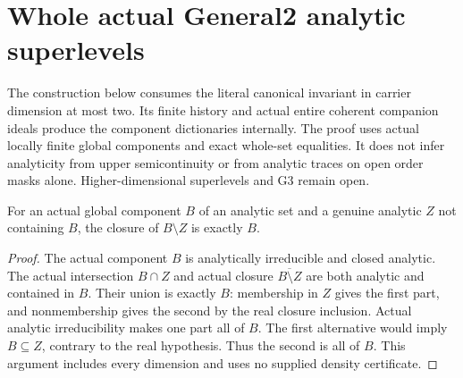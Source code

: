 \section{Whole actual General2 analytic superlevels}

The construction below consumes the literal canonical invariant in carrier
dimension at most two. Its finite history and actual entire coherent companion
ideals produce the component dictionaries internally. The proof uses actual
locally finite global components and exact whole-set equalities. It does not
infer analyticity from upper semicontinuity or from analytic traces on open
order masks alone. Higher-dimensional superlevels and G3 remain open.

\begin{lemma}
\label{hir:general-two-component-complement-dense}
\leanok
For an actual global component $B$ of an analytic set and a genuine analytic
$Z$ not containing $B$, the closure of $B\setminus Z$ is exactly $B$.
\end{lemma}
\begin{proof}
The actual component $B$ is analytically irreducible and closed analytic.
The actual intersection $B\cap Z$ and actual closure
$\overline{B\setminus Z}$ are both analytic and contained in $B$.
Their union is exactly $B$: membership in $Z$ gives the first part, and
nonmembership gives the second by the real closure inclusion. Actual
analytic irreducibility makes one part all of $B$. The first alternative
would imply $B\subseteq Z$, contrary to the real hypothesis. Thus the
second is all of $B$. This argument includes every dimension and uses no
supplied density certificate.
\end{proof}

